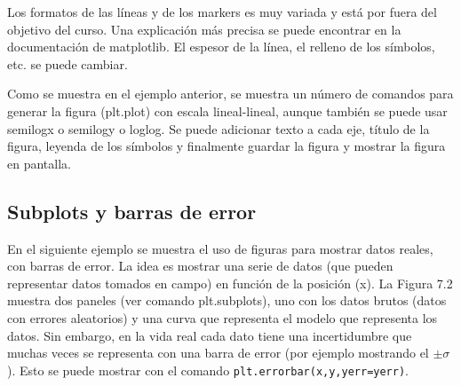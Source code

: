 \documentclass[11pt]{article}
\begin{document}
    Los formatos de las líneas y de los markers es muy variada y está por
fuera del objetivo del curso. Una explicación más precisa se puede
encontrar en la documentación de matplotlib. El espesor de la línea, el
relleno de los símbolos, etc. se puede cambiar.

Como se muestra en el ejemplo anterior, se muestra un número de comandos
para generar la figura (plt.plot) con escala lineal-lineal, aunque
también se puede usar semilogx o semilogy o loglog. Se puede adicionar
texto a cada eje, título de la figura, leyenda de los símbolos y
finalmente guardar la figura y mostrar la figura en pantalla.

    \hypertarget{subplots-y-barras-de-error}{%
\subsection{Subplots y barras de
error}\label{subplots-y-barras-de-error}}

    En el siguiente ejemplo se muestra el uso de figuras para mostrar datos
reales, con barras de error. La idea es mostrar una serie de datos (que
pueden representar datos tomados en campo) en función de la posición
(x). La Figura 7.2 muestra dos paneles (ver comando plt.subplots), uno
con los datos brutos (datos con errores aleatorios) y una curva que
representa el modelo que representa los datos. Sin embargo, en la vida
real cada dato tiene una incertidumbre que muchas veces se representa
con una barra de error (por ejemplo mostrando el \(\pm \sigma\)). Esto
se puede mostrar con el comando \texttt{plt.errorbar(x,y,yerr=yerr)}.
\end{document}

